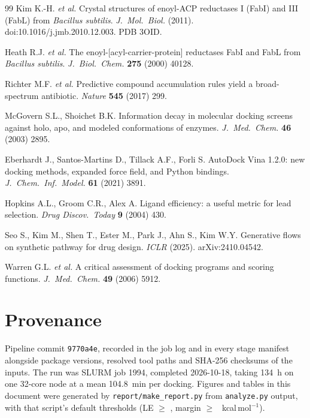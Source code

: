 \documentclass[11pt,a4paper]{article}
\begin{document}
\begin{thebibliography}{99}
 Kim K.-H. \textit{et al.} Crystal structures of enoyl-ACP
reductases I (FabI) and III (FabL) from \textit{Bacillus subtilis}.
\textit{J.\ Mol.\ Biol.} (2011). doi:10.1016/j.jmb.2010.12.003. PDB 3OID.

 Heath R.J. \textit{et al.} The
enoyl-[acyl-carrier-protein] reductases FabI and FabL from \textit{Bacillus
subtilis}. \textit{J.\ Biol.\ Chem.} \textbf{275} (2000) 40128.

 Richter M.F. \textit{et al.} Predictive compound
accumulation rules yield a broad-spectrum antibiotic. \textit{Nature}
\textbf{545} (2017) 299.

 McGovern S.L., Shoichet B.K. Information decay in
molecular docking screens against holo, apo, and modeled conformations of
enzymes. \textit{J.\ Med.\ Chem.} \textbf{46} (2003) 2895.

 Eberhardt J., Santos-Martins D., Tillack A.F., Forli S.
AutoDock Vina 1.2.0: new docking methods, expanded force field, and Python
bindings. \textit{J.\ Chem.\ Inf.\ Model.} \textbf{61} (2021) 3891.

 Hopkins A.L., Groom C.R., Alex A. Ligand efficiency: a
useful metric for lead selection. \textit{Drug Discov.\ Today} \textbf{9}
(2004) 430.

 Seo S., Kim M., Shen T., Ester M., Park J., Ahn S.,
Kim W.Y. Generative flows on synthetic pathway for drug design.
\textit{ICLR} (2025). arXiv:2410.04542.

 Warren G.L. \textit{et al.} A critical assessment of
docking programs and scoring functions. \textit{J.\ Med.\ Chem.} \textbf{49}
(2006) 5912.
\end{thebibliography}

\appendix
\section{Provenance}

Pipeline commit \texttt{9770a4e}, recorded in the job log and in every stage
manifest alongside package versions, resolved tool paths and SHA-256 checksums
of the inputs. The run was SLURM job 1994, completed 2026-10-18, taking 134~h
on one 32-core node at a mean 104.8~min per docking. Figures and tables in
this document were generated by \texttt{report/make\_report.py} from
\texttt{analyze.py} output, with that script's default thresholds
(LE $\geq$ \leFloor, margin $\geq$ \marginMin{}~kcal\,mol$^{-1}$).
\end{document}

